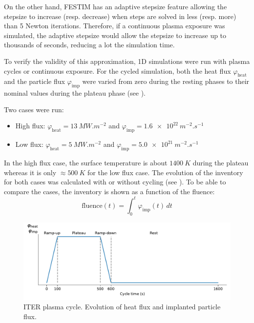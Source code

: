 On the other hand, FESTIM has an adaptive stepsize feature allowing the stepsize to increase (resp. decrease) when steps are solved in less (resp. more) than 5 Newton iterations.
Therefore, if a continuous plasma exposure was simulated, the adaptive stepsize would allow the stepsize to increase up to thousands of seconds, reducing a lot the simulation time.

To verify the validity of this approximation, 1D simulations were run with plasma cycles or continuous exposure.
For the cycled simulation, both the heat flux $\varphi_\mathrm{heat}$ and the particle flux $\varphi_\mathrm{imp}$ were varied from zero during the resting phases to their nominal values during the plateau phase (see ).

Two cases were run:
\begin{itemize}
    \item High flux: $\varphi_\mathrm{heat} = \SI{13}{MW.m^{-2}}$ and $\varphi_\mathrm{imp} = \SI{1.6e22}{m^{-2}.s^{-1}}$
    \item Low flux: $\varphi_\mathrm{heat} = \SI{5}{MW.m^{-2}}$ and $\varphi_\mathrm{imp} = \SI{5.0e21}{m^{-2}.s^{-1}}$
\end{itemize}

In the high flux case, the surface temperature is about $\SI{1400}{K}$ during the plateau whereas it is only $\approx \SI{500}{K}$ for the low flux case.
The evolution of the inventory for both cases was calculated with or without cycling (see ).
To be able to compare the cases, the inventory is shown as a function of the fluence:
\begin{equation}
    \mathrm{fluence}(t) = \int_0^t \varphi_\mathrm{imp}(t) \, dt
\end{equation}


\begin{figure}
    \centering
    \includegraphics[width=\linewidth]{Figures/Chapter3/monoblocks/cycle.pdf}
    \caption{ITER plasma cycle. Evolution of heat flux and implanted particle flux.}
\end{figure}

